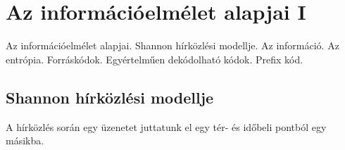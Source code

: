 \documentclass[../main.tex]{subfiles}
\begin{document}
\section{Az információelmélet alapjai I}

\begin{fulltheorem}
  Az információelmélet alapjai. Shannon hírközlési modellje. Az információ.
  Az entrópia. Forráskódok. Egyértelműen dekódolható kódok. Prefix kód.
\end{fulltheorem}

\subsection{Shannon hírközlési modellje}

A hírközlés során egy üzenetet juttatunk el
egy tér- és időbeli pontból egy másikba.
\end{document}
